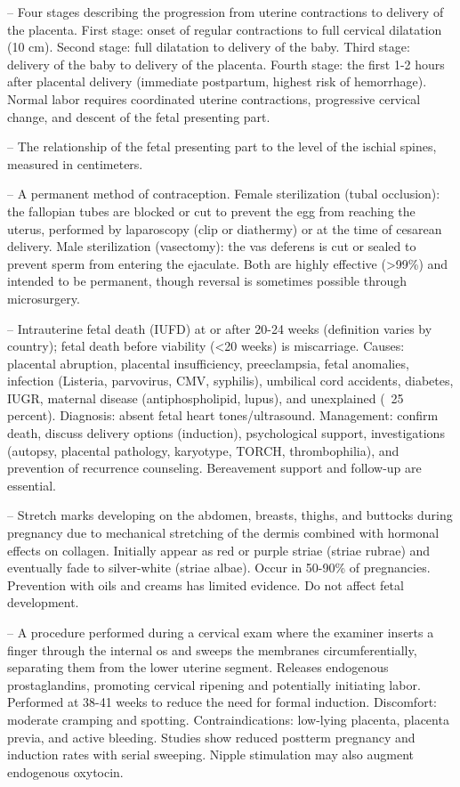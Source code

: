 -- Four stages describing the progression from uterine contractions to delivery of the placenta. First stage: onset of regular contractions to full cervical dilatation (10 cm). Second stage: full dilatation to delivery of the baby. Third stage: delivery of the baby to delivery of the placenta. Fourth stage: the first 1-2 hours after placental delivery (immediate postpartum, highest risk of hemorrhage). Normal labor requires coordinated uterine contractions, progressive cervical change, and descent of the fetal presenting part.

-- The relationship of the fetal presenting part to the level of the ischial spines, measured in centimeters.

-- A permanent method of contraception. Female sterilization (tubal occlusion): the fallopian tubes are blocked or cut to prevent the egg from reaching the uterus, performed by laparoscopy (clip or diathermy) or at the time of cesarean delivery. Male sterilization (vasectomy): the vas deferens is cut or sealed to prevent sperm from entering the ejaculate. Both are highly effective (>99\%) and intended to be permanent, though reversal is sometimes possible through microsurgery.

-- Intrauterine fetal death (IUFD) at or after 20-24 weeks (definition varies by country); fetal death before viability (<20 weeks) is miscarriage. Causes: placental abruption, placental insufficiency, preeclampsia, fetal anomalies, infection (Listeria, parvovirus, CMV, syphilis), umbilical cord accidents, diabetes, IUGR, maternal disease (antiphospholipid, lupus), and unexplained (~25 percent). Diagnosis: absent fetal heart tones/ultrasound. Management: confirm death, discuss delivery options (induction), psychological support, investigations (autopsy, placental pathology, karyotype, TORCH, thrombophilia), and prevention of recurrence counseling. Bereavement support and follow-up are essential.

-- Stretch marks developing on the abdomen, breasts, thighs, and buttocks during pregnancy due to mechanical stretching of the dermis combined with hormonal effects on collagen. Initially appear as red or purple striae (striae rubrae) and eventually fade to silver-white (striae albae). Occur in 50-90\% of pregnancies. Prevention with oils and creams has limited evidence. Do not affect fetal development.

-- A procedure performed during a cervical exam where the examiner inserts a finger through the internal os and sweeps the membranes circumferentially, separating them from the lower uterine segment. Releases endogenous prostaglandins, promoting cervical ripening and potentially initiating labor. Performed at 38-41 weeks to reduce the need for formal induction. Discomfort: moderate cramping and spotting. Contraindications: low-lying placenta, placenta previa, and active bleeding. Studies show reduced postterm pregnancy and induction rates with serial sweeping. Nipple stimulation may also augment endogenous oxytocin.

